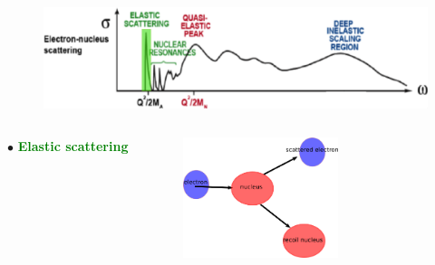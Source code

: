 \documentclass[12pt]{beamer}
\begin{document}

\begin{frame}

\begin{figure}[]
\centering
\includegraphics[width=12cm]{../images/Thesis/E_nucleus_spect_Elas.png}
\end{figure}
\begin{columns}[c] %
$\bullet$ \textbf{\textcolor{green}{Elastic scattering}}\\
\vspace{-30pt}
\begin{figure}[]
\includegraphics[height=3.5cm]{../images/elast_draw.png}
\end{figure}





\end{columns}
\end{frame}

\end{document}
